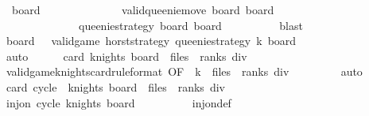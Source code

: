 \begin{isabellebody}
\ {\isachardoublequoteopen}{\isasymexists}\ board{\isacharprime}{\isacharprime}{\isachardot}\isanewline
\ \ \ \ \ \ \ \ \ \ \ \ \ \ valid{\isacharunderscore}queenie{\isacharunderscore}move\ board{\isacharprime}\ board{\isacharprime}{\isacharprime}\ {\isasymand}\isanewline
\ \ \ \ \ \ \ \ \ \ \ \ \ \ {\isacharquery}queenie{\isacharunderscore}strategy\ board{\isacharprime}\ board{\isacharprime}{\isacharprime}{\isachardoublequoteclose}\isanewline
\ \ \ \ \ \ \ \ \isamarkupfalse%
\ blast\isanewline
\ \ \ \ \isamarkupfalse%
\isanewline
\isanewline
\ \ \ \ \isamarkupfalse%
\ \isamarkupfalse%
\ board\ \ {\isacharasterisk}{\isacharasterisk}{\isacharcolon}\ {\isachardoublequoteopen}valid{\isacharunderscore}game\ horst{\isacharunderscore}strategy\ {\isacharquery}queenie{\isacharunderscore}strategy\ k\ board{\isachardoublequoteclose}\isanewline
\ \ \ \ \ \ \isamarkupfalse%
\ {\isacharasterisk}\isanewline
\ \ \ \ \ \ \isamarkupfalse%
\ auto\isanewline
\isanewline
\ \ \ \ \isamarkupfalse%
\ {\isachardoublequoteopen}card\ {\isacharparenleft}knights\ board{\isacharparenright}\ {\isachargreater}\ {\isacharparenleft}files\ {\isacharasterisk}\ ranks{\isacharparenright}\ div\ {}{\isachardoublequoteclose}\isanewline
\ \ \ \ \ \ \isamarkupfalse%
\ valid{\isacharunderscore}game{\isacharunderscore}knights{\isacharunderscore}card{\isacharbrackleft}rule{\isacharunderscore}format{\isacharcomma}\ OF\ {\isacharasterisk}{\isacharasterisk}{\isacharbrackright}\ {\isacharbackquoteopen}k\ {\isachargreater}\ {\isacharparenleft}files\ {\isacharasterisk}\ ranks{\isacharparenright}\ div\ {}{\isacharbackquoteclose}\isanewline
\ \ \ \ \ \ \isamarkupfalse%
\ auto\isanewline
\isanewline
\ \ \ \ \isamarkupfalse%
\ {\isachardoublequoteopen}card\ {\isacharparenleft}cycle\ {\isacharbackquote}\ {\isacharparenleft}knights\ board{\isacharparenright}{\isacharparenright}\ {\isachargreater}\ {\isacharparenleft}files\ {\isacharasterisk}\ ranks{\isacharparenright}\ div\ {}{\isachardoublequoteclose}\isanewline
\ \ \ \ \isamarkupfalse%
{\isacharminus}\isanewline
\ \ \ \ \ \ \isamarkupfalse%
\ {\isachardoublequoteopen}inj{\isacharunderscore}on\ cycle\ {\isacharparenleft}knights\ board{\isacharparenright}{\isachardoublequoteclose}\isanewline
\ \ \ \ \ \ \ \ \isamarkupfalse%
\ inj{\isacharunderscore}on{\isacharunderscore}def\isanewline
\ \ \ \ \ \ \isamarkupfalse%

\end{isabellebody}
